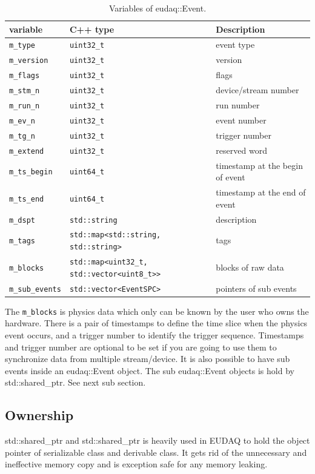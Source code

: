 \begin{table}
\centering
\small
\begin{tabular}{ l | l | l }
  \textbf{variable} & \textbf{C++ type} & \textbf{Description}\\
  \hline
  \texttt{m\_type} & \texttt{uint32\_t} & event type\\
  \texttt{m\_version} & \texttt{uint32\_t} & version\\
  \texttt{m\_flags} & \texttt{uint32\_t} & flags\\
  \texttt{m\_stm\_n} & \texttt{uint32\_t} & device/stream number\\
  \texttt{m\_run\_n} & \texttt{uint32\_t} & run number\\
  \texttt{m\_ev\_n} & \texttt{uint32\_t} & event number\\
  \texttt{m\_tg\_n} & \texttt{uint32\_t} & trigger number\\
  \texttt{m\_extend} & \texttt{uint32\_t} & reserved word\\
  \texttt{m\_ts\_begin} & \texttt{uint64\_t} & timestamp at the begin of event\\
  \texttt{m\_ts\_end} & \texttt{uint64\_t} & timestamp at the end of event\\
  \texttt{m\_dspt} & \texttt{std::string} & description\\
  \texttt{m\_tags} & \texttt{std::map<std::string, std::string>} & tags\\
  \texttt{m\_blocks} & \texttt{std::map<uint32\_t, std::vector<uint8\_t>>} & blocks of raw data\\
  \texttt{m\_sub\_events} & \texttt{std::vector<EventSPC>} & pointers of sub events\\
\end{tabular}
\caption{Variables of eudaq::Event.}
\label{tab:eventdata}
\end{table}

The \texttt{m\_blocks} is physics data which only can be known by the user who owns the hardware. There is a pair of timestamps to define the time slice when the physics event occurs, and a trigger number to identify the trigger sequence. Timestamps and trigger number are optional to be set if you are going to use them to synchronize data from multiple stream/device. It is also possible to have sub events inside an eudaq::Event object. The sub eudaq::Event objects is hold by std::shared\_ptr. See next sub section.

\subsection{Ownership}
std::shared\_ptr and std::shared\_ptr is heavily used in EUDAQ to hold the object pointer of serializable class and derivable class. It gets rid of the unnecessary and ineffective memory copy and is exception safe for any memory leaking.

